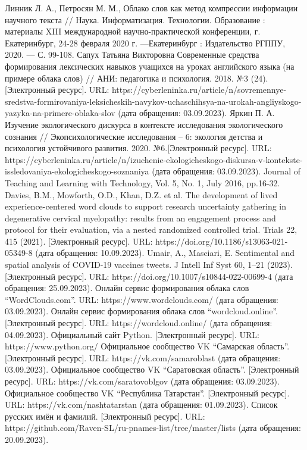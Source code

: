 \documentclass[bachelor, och, coursework ]{SCWorks}
\begin{document}
\conclusion



%
\begin{thebibliography}{99}
  Линник Л. А., Петросян М. М., Облако слов как метод компрессии информации научного текста // Наука. Информатизация. Технологии. Образование : материалы XIII международной научно-практической конференции, г. Екатеринбург, 24-28 февраля 2020 г. ---Екатеринбург : Издательство РГППУ, 2020. --- С. 99-108. 
 Сапух Татьяна Викторовна Современные средства формирования лексических навыков учащихся на уроках английского языка (на примере облака слов) // АНИ: педагогика и психология. 2018. №3 (24).[Электронный ресурс]. URL: https://cyberleninka.ru/article/n/sovremennye-sredstva-formirovaniya-leksicheskih-navykov-uchaschihsya-na-urokah-angliyskogo-yazyka-na-primere-oblaka-slov (дата обращения: 03.09.2023).
 Яркин П. А. Изучение экологического дискурса в контексте исследования экологического сознания // Экопсихологические исследования – 6: экология детства и психология устойчивого развития. 2020. №6.[Электронный ресурс]. URL: https://cyberleninka.ru/article/n/izuchenie-ekologicheskogo-diskursa-v-kontekste-issledovaniya-ekologicheskogo-soznaniya (дата обращения: 03.09.2023).
 Journal of Teaching and Learning with Technology, Vol. 5, No. 1, July 2016, pp.16-32.
 Davies, B.M., Mowforth, O.D., Khan, D.Z. et al. The development of lived experience-centered word clouds to support research uncertainty gathering in degenerative cervical myelopathy: results from an engagement process and protocol for their evaluation, via a nested randomized controlled trial. Trials 22, 415 (2021). [Электронный ресурс]. URL: https://doi.org/10.1186/s13063-021-05349-8 (дата обращения: 10.09.2023).
 Umair, A., Masciari, E. Sentimental and spatial analysis of COVID-19 vaccines tweets. J Intell Inf Syst 60, 1–21 (2023). [Электронный ресурс]. URL: https://doi.org/10.1007/s10844-022-00699-4 (дата обращения: 25.09.2023).
 Онлайн сервис формирования облака слов ``WordClouds.com''.  URL: https://www.wordclouds.com/ (дата обращения: 03.09.2023).
 Онлайн сервис формирования облака слов ``wordcloud.online''. [Электронный ресурс]. URL: https://wordcloud.online/ (дата обращения: 04.09.2023).
 Официальный сайт Python. [Электронный ресурс]. URL: https://www.python.org/
  Официальное сообщество VK ``Самарская область''. [Электронный ресурс]. URL: https://vk.com/samaroblast (дата обращения: 03.09.2023).
  Официальное сообщество VK ``Саратовская область''. [Электронный ресурс]. URL: https://vk.com/saratovoblgov (дата обращения: 03.09.2023).
  Официальное сообщество VK ``Республика Татарстан''. [Электронный ресурс]. URL: https://vk.com/nashtatarstan (дата обращения: 01.09.2023).
 Список русских имён и фамилий. [Электронный ресурс]. URL: https://github.com/Raven-SL/ru-pnames-list/tree/master/lists (дата обращения: 20.09.2023).
\end{thebibliography}
\end{document}
